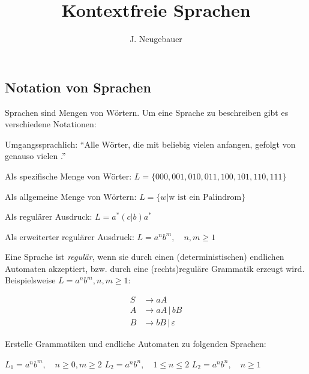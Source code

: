 \documentclass[10pt, a4paper]{scrartcl}
\author{J. Neugebauer}
\title{Kontextfreie Sprachen}
\date{\Heute}
\begin{document}
\ReiheTitel

\begin{infobox}
\subsection*{Notation von Sprachen}
Sprachen sind Mengen von Wörtern. Um eine Sprache zu beschreiben gibt es verschiedene Notationen:
\begin{smallitemize}
	\item Umgangssprachlich: \enquote{Alle Wörter, die mit beliebig vielen  anfangen, gefolgt von genauso vielen .}
	\item Als spezifische Menge von Wörter: $L = \{ 000, 001, 010, 011, 100, 101, 110, 111 \}$
	\item Als allgemeine Menge von Wörtern: $L = \{ w | \text{w ist ein Palindrom} \}$
	\item Als regulärer Ausdruck: $L = a^{*}(c|b)a^{*}$
	\item Als erweiterter regulärer Ausdruck: $L = a^nb^m, \quad n,m \geq 1$
\end{smallitemize}
\end{infobox}

Eine Sprache ist \emph{regulär}, wenn sie durch einen (deterministischen) endlichen Automaten akzeptiert, bzw. durch eine (rechts)reguläre Grammatik erzeugt wird. Beispielsweise $L=a^nb^m, n,m \geq 1$:
\begin{figure}[h]
	\begin{subfigure}{.5\textwidth}
		\begin{transitiongraph}[fa]
		\end{transitiongraph}
	\end{subfigure}%
	\begin{subfigure}{.5\textwidth}
		\begin{align*}
		S &\rightarrow a A \\
		A &\rightarrow a A \,|\, b B \\
		B &\rightarrow b B \,|\, \varepsilon
		\end{align*}
	\end{subfigure}
\end{figure}

\begin{aufgabe}
\label{aufg:grammatiken-erstellen}
Erstelle Grammatiken und endliche Automaten zu folgenden Sprachen:
\begin{teilaufgaben}
	\teilaufgabe $L_1 = a^nb^m, \quad n\geq 0, m \geq 2$
	\teilaufgabe $L_2 = a^nb^n, \quad 1\leq n \leq 2$
	\teilaufgabe $L_2 = a^nb^n, \quad n \geq 1$
\end{teilaufgaben}
\end{aufgabe}
\end{document}
